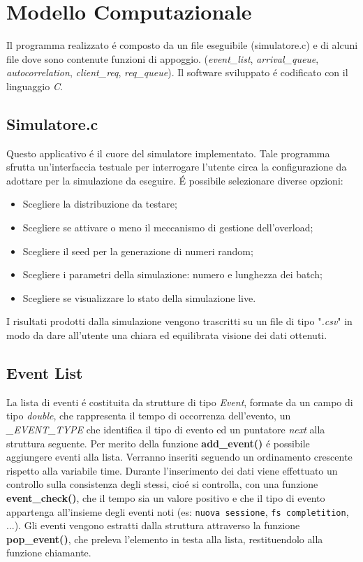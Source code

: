 \chapter{Modello Computazionale}
Il programma realizzato \'e composto da un file eseguibile (simulatore.c) e di 
alcuni file dove sono contenute funzioni di appoggio. (\textit{event\_list}, 
\textit{arrival\_queue}, \textit{autocorrelation}, \textit{client\_req}, 
\textit{req\_queue}).
Il software sviluppato \'e codificato con il linguaggio \textit{C}.

\section{Simulatore.c}

Questo applicativo \'e il cuore del simulatore implementato. Tale programma 
sfrutta un'interfaccia testuale per interrogare l'utente circa la 
configurazione 
da adottare per la simulazione da eseguire. 
\'E possibile selezionare diverse opzioni:
\begin{itemize}
\item Scegliere la distribuzione da testare;
\item Scegliere se attivare o meno il meccanismo di gestione dell'overload;
\item Scegliere il seed per la generazione di numeri random;
\item Scegliere i parametri della simulazione: numero e lunghezza dei batch;
\item Scegliere se visualizzare lo stato della simulazione live.
\end{itemize}

I risultati prodotti dalla simulazione vengono trascritti su un file di tipo 
"\textit{.csv}"  in modo da dare all'utente una chiara ed equilibrata visione 
dei dati ottenuti.

\section{Event List}
La lista di eventi \'e costituita da strutture di tipo \textit{Event}, formate 
da un campo di tipo \textit{double}, che rappresenta il tempo 
di occorrenza dell'evento, un \textit{\_EVENT\_TYPE} che identifica il tipo di 
evento 
ed un puntatore \textit{next} alla struttura seguente.
Per merito della funzione \textbf{add\_event()} \'e possibile aggiungere eventi 
alla lista. Verranno inseriti seguendo un ordinamento crescente rispetto alla 
variabile time. Durante l'inserimento dei dati viene effettuato un controllo 
sulla consistenza degli stessi, cio\'e si controlla, con una funzione 
\textbf{event\_check()}, che il tempo sia un valore positivo e che il tipo di 
evento appartenga all'insieme degli eventi noti (es: \texttt{nuova sessione}, 
\texttt{fs completition}, ...).     
Gli eventi vengono estratti dalla struttura attraverso la funzione 
\textbf{pop\_event()}, che preleva l'elemento in testa alla lista, 
restituendolo 
alla funzione chiamante.

